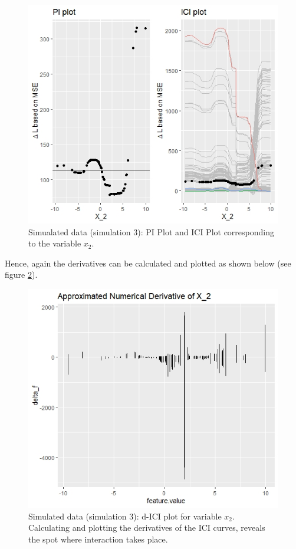 \documentclass[
]{krantz}
\begin{document}
\begin{figure}

{\centering \includegraphics[width=0.99\linewidth]{images/03-7-NL1} 

}

\caption{Simualated data (simulation 3): PI Plot and ICI Plot corresponding to the variable $x_{2}$.}\label{fig:fig7}
\end{figure}

Hence, again the derivatives can be calculated and plotted as shown below (see figure \ref{fig:fig8}).

\begin{figure}

{\centering \includegraphics[width=0.99\linewidth]{images/03-7-NL2} 

}

\caption{Simulated data (simulation 3): d-ICI plot for variable $x_{2}$. Calculating and plotting the derivatives of the ICI curves, reveals the spot where interaction takes place.}\label{fig:fig8}
\end{figure}
\end{document}
